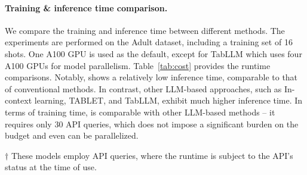 \documentclass{article}
\theoremstyle{plain}
\theoremstyle{definition}
\theoremstyle{remark}
\newcommand{\cutparagraphup}{\vspace*{-0.12in}}
\begin{document}
\paragraph{Training \& inference time comparison.}
We compare the training and inference time between different methods. The experiments are performed on the Adult dataset, including a training set of 16 shots. One A100 GPU is used as the default, except for TabLLM which uses four A100 GPUs for model parallelism. Table~\ref{tab:cost} provides the runtime comparisons. Notably, \model{} shows a relatively low inference time, comparable to that of conventional methods. In contrast, other LLM-based approaches, such as In-context learning, TABLET, and TabLLM, exhibit much higher inference time. In terms of training time, \model{} is comparable with other LLM-based methods -- it requires only 30 API queries, which does not impose a significant burden on the budget and even can be parallelized. 
%
\begin{table}[t!]
\setlength{\tabcolsep}{4pt}
\centering
\caption{Comparison of training (with 16 samples) and inference (over one sample) time on Adult.}
\begin{flushleft}
$\dagger$ \small{These models employ API queries, where the runtime is subject to the API's status at the time of use. }
\end{flushleft}
\label{tab:cost}
\end{table}
%
%

\cutparagraphup
\end{document}
